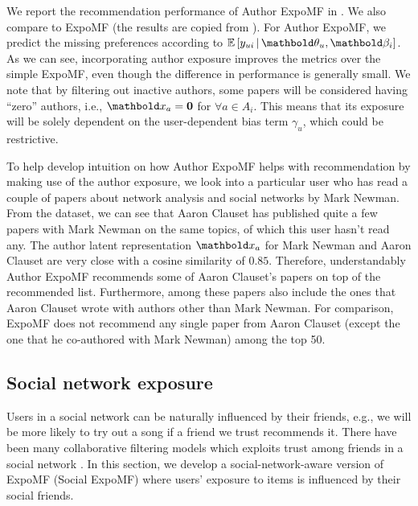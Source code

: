  We report the recommendation performance of Author ExpoMF in . We also compare to ExpoMF (the results are copied from ). For Author ExpoMF, we predict the missing preferences according to $\E{y_{ui} \g \mb\theta_u, \mb\beta_i}$. As we can see, incorporating author exposure improves the metrics over the simple ExpoMF, even though the difference in performance is generally small. We note that by filtering out inactive authors, some papers will be considered having ``zero'' authors, i.e., $\mbx_a = \bzero$ for $\forall a\in A_i$. This means that its exposure will be solely dependent on the user-dependent bias term $\gamma_u$, which could be restrictive. 

 To help develop intuition on how Author ExpoMF helps with recommendation by making use of the author exposure, we look into a particular user who has read a couple of papers about network analysis and social networks by Mark Newman. From the dataset, we can see that Aaron Clauset has published quite a few papers with Mark Newman on the same topics, of which this user hasn't read any. The author latent representation $\mbx_a$ for Mark Newman and Aaron Clauset are very close with a cosine similarity of $0.85$. Therefore, understandably Author ExpoMF recommends some of Aaron Clauset's papers on top of the recommended list. Furthermore, among these papers also include the ones that Aaron Clauset wrote with authors other than Mark Newman. For comparison, ExpoMF does not recommend any single paper from Aaron Clauset (except the one that he co-authored with Mark Newman) among the top 50. 


\subsection{Social network exposure}

Users in a social network can be naturally influenced by their friends, e.g., we will be more likely to try out a song if a friend we trust recommends it. There have been many collaborative filtering models which exploits trust among friends in a social network \citep{ma2008sorec,ma2009learning,ma2011recommender,guo2015trustsvd,chaney2015probabilistic}. In this section, we develop a social-network-aware version of ExpoMF (Social ExpoMF) where users' exposure to items is influenced by their social friends.

